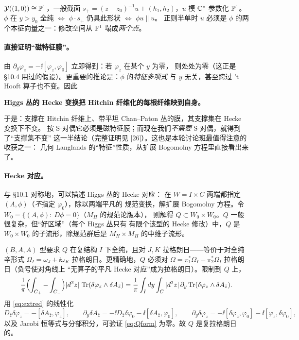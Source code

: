 \begin{example}[$U(2)$，$\Ldual w=(1,0)$：数出两个点]
$\mathcal{Y}((1,0))\cong\mathbb{P}^1$，一般截面
$s_+=(z-z_0)^{-1}u+(h_1,h_2)$，$u$ 模 $\mathbb{C}^*$ 参数化 $\mathbb{P}^1$。
$\phi$ 在 $y>y_0$ 全纯 $\iff$ $\phi\cdot s_+$ 仍具此形状 $\iff$ $\phi u\parallel u$。
正则半单时 $u$ 必须是 $\phi$ 的两个本征向量之一：修改空间从 $\mathbb{P}^1$ 塌成\emph{两个点}。
\pA{}
\end{example}

\paragraph{直接证明“磁特征膜”。}由
$\partial_y\varphi_z=-\ii[\varphi_z,\varphi_0]$ 立即得到：若 $\varphi_z$ 在某个 $y$ 为零，
则处处为零（这正是 §10.4 用过的假设）。更重要的推论是：$\phi$ 的\emph{特征多项式}
与 $y$ 无关，甚至跨过 't Hooft{} 算子也不变。因此
\begin{center}
\textbf{Higgs 丛的 Hecke 变换把 Hitchin 纤维化的每根纤维映到自身。}
\end{center}
于是：支撑在 Hitchin 纤维上、带平坦 Chan--Paton 丛的膜，其支撑集在 Hecke 变换下不变。
按 S-对偶它必须是磁特征膜；而现在我们\emph{不需要} S-对偶，就得到了“支撑集不变”
这一半结论（完整证明见 [26]）。这也是本轮讨论班最值得注意的收获之一：
几何 Langlands 的“特征”性质，从扩展 Bogomolny 方程里直接看出来了。\pA{}

\paragraph{Hecke 对应。}与 §10.1 对称地，可以描述 Higgs 丛的 Hecke 对应：
在 $W=I\times C$ 两端都指定 $(A,\phi)$（\emph{不}指定 $\varphi_0$），除以两端平凡的
规范变换，解扩展 Bogomolny 方程。令 $W_0=\{(A,\phi):\ D\phi=0\}$（$M_H$ 的规范论版本），
则解得 $Q\subset W_0\times W_0$。$Q$ 一般很复杂，但“好区域”（每个 Higgs 丛只有
有限个该型的 Hecke 修改）中，$Q$ 是 $W_0\times W_0$ 的子流形，除规范群后是
$M_H\times M_H$ 的中维子流形。\pA{}

$(B,A,A)$ 型要求 $Q$ 在复结构 $I$ 下全纯，且对 $J,K$ 拉格朗日——等价于对全纯辛形式
$\Omega_I=\omega_J+\ii\omega_K$ 拉格朗日。更精确地，$Q$ 必须对
$\Omega=\pi_1^*\Omega_I-\pi_2^*\Omega_I$ 拉格朗日（负号使对角线上
“无算子的平凡 Hecke 对应”成为拉格朗日）。限制到 $Q$ 上，
\begin{equation}
\frac{1}{\pi}\Bigl(\int_{C_+}-\int_{C_-}\Bigr)|d^2z|\,\operatorname{Tr}(\delta\varphi_z\wedge\delta A_{\bar z})
=\frac{1}{\pi}\int_I dy\int_C|d^2z|\,\partial_y\operatorname{Tr}(\delta\varphi_z\wedge\delta A_{\bar z}).
\label{eq:Qform}
\end{equation}
用 \eqref{eq:extred} 的线性化
\begin{equation}
D_{\bar z}\delta\varphi_z=-[\delta A_{\bar z},\varphi_z],\qquad
\partial_y\delta A_{\bar z}=-\ii D_{\bar z}\delta\varphi_0-\ii[\delta A_{\bar z},\varphi_0],\qquad
\partial_y\delta\varphi_z=-\ii[\delta\varphi_z,\varphi_0]-\ii[\varphi_z,\delta\varphi_0],
\label{eq:Qlin}
\end{equation}
以及 Jacobi 恒等式与分部积分，可验证 \eqref{eq:Qform} 为零。故 $Q$ 是复拉格朗日的。
\pA{}

